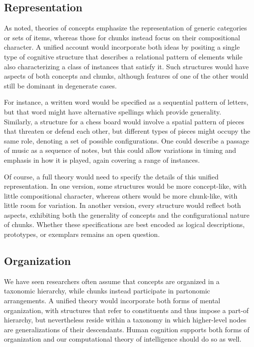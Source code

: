 \documentclass[11pt,letterpaper]{article}
\begin{document}

\subsection{Representation} 

As noted, theories of concepts emphasize the representation of
generic categories or sets of items, whereas those for chunks
instead focus on their compositional character. A unified account 
would incorporate both ideas by positing a single type of cognitive
structure that describes a relational pattern of elements while also
characterizing a class of instances that satisfy it. Such structures
would have aspects of both concepts and chunks, although features of
one of the other would still be dominant in degenerate cases. 

For instance, a written word would be specified as a sequential
pattern of letters, but that word might have alternative spellings
which provide generality. Similarly, a structure for a chess board
would involve a spatial pattern of pieces that threaten or defend
each other, but different types of pieces might occupy the same role,
denoting a set of possible configurations. One could describe a passage
of music as a sequence of notes, but this could allow variations in
timing and emphasis in how it is played, again covering a range of
instances. 


Of course, a full theory would need to specify the details of this
unified representation. In one version, some structures would be
more concept-like, with little compositional character, whereas
others would be more chunk-like, with little room for variation.
In another version, every structure would reflect both aspects, 
exhibiting both the generality of concepts and the configurational
nature of chunks. Whether these specifications are best encoded as
logical descriptions, prototypes, or exemplars remains an open question. 

\subsection{Organization}

We have seen researchers often assume that concepts are organized in a
taxonomic hierarchy, while chunks instead participate in partonomic
arrangements. A unified theory would incorporate both forms of mental
organization, with structures that refer to constituents and thus
impose a part-of hierarchy, but nevertheless reside within a taxonomy
in which higher-level nodes are generalizations of their descendants.
Human cognition supports both forms of organization and our computational
theory of intelligence should do so as well.
\end{document}
